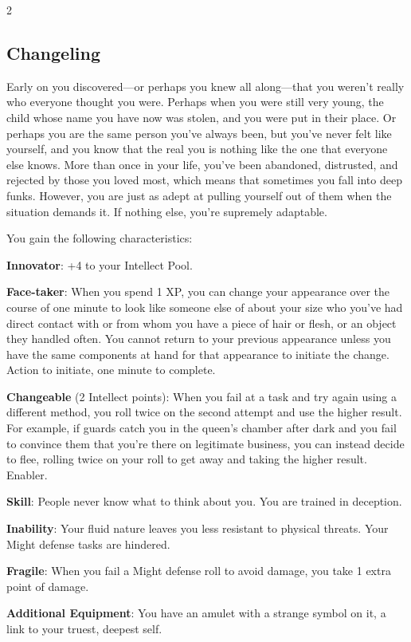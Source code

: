 \begin{multicols}{2}
\subsection{Changeling}

Early on you discovered—or perhaps you knew all along—that you weren’t really who everyone thought you were. Perhaps when you were still very young, the child whose name you have now was stolen, and you were put in their place. Or perhaps you are the same person you’ve always been, but you’ve never felt like yourself, and you know that the real you is nothing like the one that everyone else knows. More than once in your life, you’ve been abandoned, distrusted, and rejected by those you loved most, which means that sometimes you fall into deep funks. However, you are just as adept at pulling yourself out of them when the situation demands it. If nothing else, you’re supremely adaptable.

You gain the following characteristics:

\textbf{Innovator}: +4 to your Intellect Pool.

\textbf{Face-taker}: When you spend 1 XP, you can change your appearance over the course of one minute to look like someone else of about your size who you’ve had direct contact with or from whom you have a piece of hair or flesh, or an object they handled often. You cannot return to your previous
appearance unless you have the same components at hand for that appearance to initiate the change. Action to initiate, one minute to complete.

\textbf{Changeable} (2 Intellect points): When you fail at a task and try again using a different method, you roll twice on the second attempt and use the higher result. For example, if guards catch you in the queen’s chamber after dark and you fail to convince them that you’re there on legitimate business, you can instead decide to flee, rolling twice on your roll to get away and taking the higher result. Enabler.

\textbf{Skill}: People never know what to think about you. You are trained in deception.

\textbf{Inability}: Your fluid nature leaves you less resistant to physical threats. Your Might defense tasks are hindered.

\textbf{Fragile}: When you fail a Might defense roll to avoid damage, you take 1 extra point of damage.

\textbf{Additional Equipment}: You have an amulet with a strange symbol on it, a link to your truest, deepest self.


\end{multicols}
